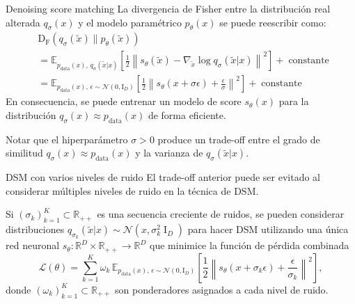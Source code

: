 \documentclass{beamer}
\newcommand{\R}{\mathbb{R}}
\begin{document}
\begin{frame}{Denoising score matching}
    La divergencia de Fisher entre la distribución real alterada $q_\sigma(x)$ y el modelo paramétrico $p_\theta(x)$ se puede reescribir como:
    \begin{align*}
         & \operatorname{D_F}\left(q_\sigma(\tilde x)\|p_\theta(\tilde x)\right)                            \\
         & = \mathbb{E}_{p_{\text{data}}(x),\,q_\sigma(\tilde x|x)}\left[\frac{1}{2}\left\|
            s_\theta(\tilde x)-\nabla_{\tilde x} \log q_\sigma(\tilde x|x)
        \right\|^2\right] + \operatorname{constante}                                                        \\
         & =\mathbb{E}_{p_{\text{data}}(x),\,\epsilon\sim\mathcal{N}(0,\text{I}_D)}\left[\frac{1}{2}\left\|
            s_\theta(x+\sigma \epsilon)+\frac{\epsilon}{\sigma}
            \right\|^2\right] + \operatorname{constante}
    \end{align*}
    En consecuencia, se puede entrenar un modelo de score $s_\theta(x)$ para la distribución $q_\sigma(x)\approx p_{\text{data}}(x)$ de forma eficiente.

    Notar que el hiperparámetro $\sigma>0$ produce un trade-off entre el grado de similitud $q_\sigma(x)\approx p_{\text{data}}(x)$ y la varianza de $q_\sigma(\tilde x|x)$.
\end{frame}

\begin{frame}{DSM con varios niveles de ruido}
    El trade-off anterior puede ser evitado al considerar múltiples niveles de ruido en la técnica de DSM.

    Si $(\sigma_k)_{k=1}^K\subset\R_{++}$ es una secuencia creciente de ruidos, se pueden considerar distribuciones $q_{\sigma_k}(\tilde x| x)\sim \mathcal{N}(x,\sigma_k^2\operatorname{I}_D)$ para hacer DSM utilizando una única red neuronal $s_\theta:\R^D\times\R_{++}\to\R^D$ que minimice la función de pérdida combinada
    \begin{equation*}
        \mathcal{L}(\theta)
        =\sum_{k=1}^K \omega_k\,\mathbb{E}_{p_{\text{data}}(x),\,\epsilon\sim\mathcal{N}(0,\text{I}_D)}\left[\frac{1}{2}\left\|
            s_\theta(x+\sigma_k \epsilon)+\frac{\epsilon}{\sigma_k}
            \right\|^2\right],
    \end{equation*}
    donde $(\omega_k)_{k=1}^K\subset\R_{++}$ son ponderadores asignados a cada nivel de ruido.
\end{frame}
\end{document}
